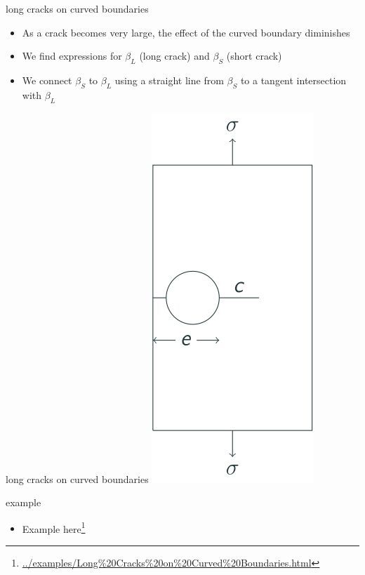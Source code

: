 \documentclass[
  letterpaper,
  ignorenonframetext,
  aspectratio=43,
  handout,
  12pt]{beamer}
\DeclareRobustCommand{\href}[2]{#2\footnote{\url{#1}}}
\providecommand{\tightlist}{%
  \setlength{\itemsep}{0pt}\setlength{\parskip}{0pt}}
\providecommand{\tightlist}{%
\setlength{\itemsep}{0pt}\setlength{\parskip}{0pt}}
\let\Oldincludegraphics\includegraphics
\renewcommand{\includegraphics}[2][]{\Oldincludegraphics[width=\textwidth,height=0.7\textheight,keepaspectratio]{#2}}
\begin{document}
\begin{frame}{long cracks on curved boundaries}
\protect\hypertarget{long-cracks-on-curved-boundaries}{}
\begin{itemize}
\tightlist
\item
  As a crack becomes very large, the effect of the curved boundary
  diminishes
\item
  We find expressions for \(\beta_L\) (long crack) and \(\beta_S\)
  (short crack)
\item
  We connect \(\beta_S\) to \(\beta_L\) using a straight line from
  \(\beta_S\) to a tangent intersection with \(\beta_L\)
\end{itemize}
\end{frame}

\begin{frame}{long cracks on curved boundaries}
\protect\hypertarget{long-cracks-on-curved-boundaries-1}{}
\includegraphics{../images/curved-long.svg}
\end{frame}

\begin{frame}{example}
\protect\hypertarget{example}{}
\begin{itemize}
\tightlist
\item
  Example
  \href{../examples/Long\%20Cracks\%20on\%20Curved\%20Boundaries.html}{here}
\end{itemize}
\end{frame}
\end{document}
